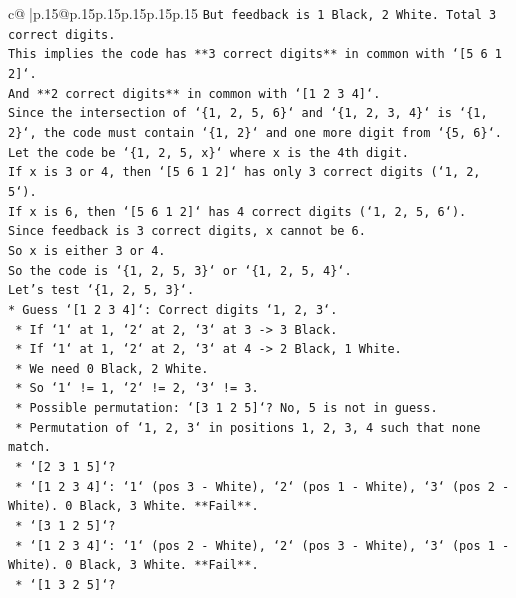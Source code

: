 \documentclass{article}
\begin{document}
{\begin{supertabular}{c@{$\;$}|p{.15\linewidth}@{}p{.15\linewidth}p{.15\linewidth}p{.15\linewidth}p{.15\linewidth}p{.15\linewidth}}
{{{\texttt{But feedback is 1 Black, 2 White. Total 3 correct digits.} \\
\texttt{This implies the code has **3 correct digits** in common with `{[}5 6 1 2{]}`.} \\
\texttt{And **2 correct digits** in common with `{[}1 2 3 4{]}`.} \\
\texttt{Since the intersection of `\{1, 2, 5, 6\}` and `\{1, 2, 3, 4\}` is `\{1, 2\}`, the code must contain `\{1, 2\}` and one more digit from `\{5, 6\}`.} \\
\texttt{Let the code be `\{1, 2, 5, x\}` where x is the 4th digit.} \\
\texttt{If x is 3 or 4, then `{[}5 6 1 2{]}` has only 3 correct digits (`1, 2, 5`).} \\
\texttt{If x is 6, then `{[}5 6 1 2{]}` has 4 correct digits (`1, 2, 5, 6`).} \\
\texttt{Since feedback is 3 correct digits, x cannot be 6.} \\
\texttt{So x is either 3 or 4.} \\
\texttt{So the code is `\{1, 2, 5, 3\}` or `\{1, 2, 5, 4\}`.} \\
\texttt{Let's test `\{1, 2, 5, 3\}`.} \\
\texttt{*   Guess `{[}1 2 3 4{]}`: Correct digits `1, 2, 3`.} \\
\texttt{    *   If `1` at 1, `2` at 2, `3` at 3 {-}> 3 Black.} \\
\texttt{    *   If `1` at 1, `2` at 2, `3` at 4 {-}> 2 Black, 1 White.} \\
\texttt{    *   We need 0 Black, 2 White.} \\
\texttt{    *   So `1` != 1, `2` != 2, `3` != 3.} \\
\texttt{    *   Possible permutation: `{[}3 1 2 5{]}`? No, 5 is not in guess.} \\
\texttt{    *   Permutation of `1, 2, 3` in positions 1, 2, 3, 4 such that none match.} \\
\texttt{    *   `{[}2 3 1 5{]}`?} \\
\texttt{        *   `{[}1 2 3 4{]}`: `1` (pos 3 {-} White), `2` (pos 1 {-} White), `3` (pos 2 {-} White). 0 Black, 3 White. **Fail**.} \\
\texttt{    *   `{[}3 1 2 5{]}`?} \\
\texttt{        *   `{[}1 2 3 4{]}`: `1` (pos 2 {-} White), `2` (pos 3 {-} White), `3` (pos 1 {-} White). 0 Black, 3 White. **Fail**.} \\
\texttt{    *   `{[}1 3 2 5{]}`?} \\
}}}
\end{supertabular}}
\end{document}
